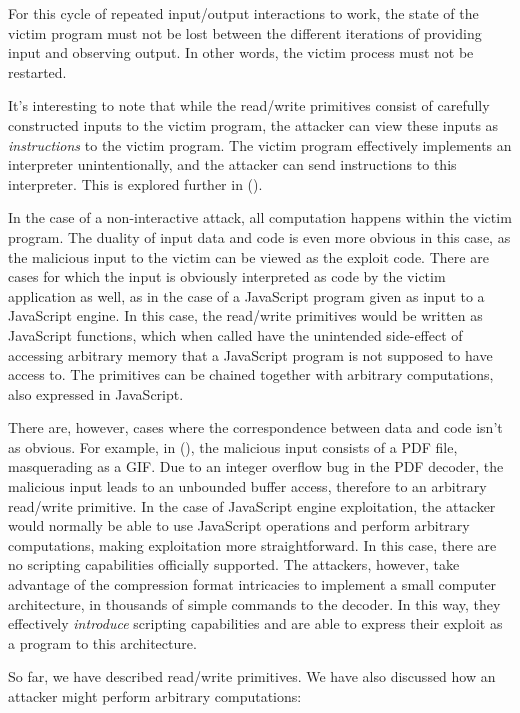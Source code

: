\documentclass[
  a4paper,
]{report}
\begin{document}
For this cycle of repeated input/output interactions to work, the state
of the victim program must not be lost between the different iterations
of providing input and observing output. In other words, the victim
process must not be restarted.

It's interesting to note that while the read/write primitives consist of
carefully constructed inputs to the victim program, the attacker can
view these inputs as \emph{instructions} to the victim program. The
victim program effectively implements an interpreter unintentionally,
and the attacker can send instructions to this interpreter. This is
explored further in ().

In the case of a non-interactive attack, all computation happens within
the victim program. The duality of input data and code is even more
obvious in this case, as the malicious input to the victim can be viewed
as the exploit code. There are cases for which the input is obviously
interpreted as code by the victim application as well, as in the case of
a JavaScript program given as input to a JavaScript engine. In this
case, the read/write primitives would be written as JavaScript
functions, which when called have the unintended side-effect of
accessing arbitrary memory that a JavaScript program is not supposed to
have access to. The primitives can be chained together with arbitrary
computations, also expressed in JavaScript.

There are, however, cases where the correspondence between data and code
isn't as obvious. For example, in (), the malicious input consists of a PDF file, masquerading as a
GIF. Due to an integer overflow bug in the PDF decoder, the malicious
input leads to an unbounded buffer access, therefore to an arbitrary
read/write primitive. In the case of JavaScript engine exploitation, the
attacker would normally be able to use JavaScript operations and perform
arbitrary computations, making exploitation more straightforward. In
this case, there are no scripting capabilities officially supported. The
attackers, however, take advantage of the compression format intricacies
to implement a small computer architecture, in thousands of simple
commands to the decoder. In this way, they effectively \emph{introduce}
scripting capabilities and are able to express their exploit as a
program to this architecture.

So far, we have described read/write primitives. We have also discussed
how an attacker might perform arbitrary computations:
\end{document}
